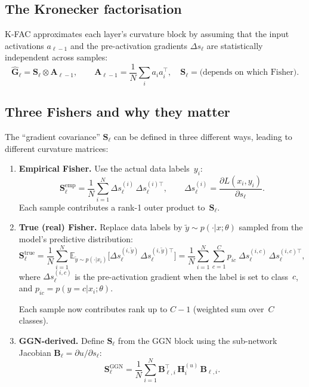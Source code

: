 \documentclass[11pt]{article}
\newcommand{\E}{\mathbb{E}}
\newcommand{\kron}{\otimes}
\begin{document}
\subsection{The Kronecker factorisation}

K-FAC approximates each layer's curvature block by assuming
that the input activations $a_{\ell-1}$ and the pre-activation
gradients $\Delta s_\ell$ are statistically independent across
samples:
\[
  \hat{\mathbf{G}}_\ell
  = \mathbf{S}_\ell \kron \mathbf{A}_{\ell-1},
  \qquad
  \mathbf{A}_{\ell-1} = \frac{1}{N}\sum_i a_i a_i^\top,
  \quad
  \mathbf{S}_\ell = \text{(depends on which Fisher)}.
\]

\subsection{Three Fishers and why they matter}
\label{sec:three-fishers}

The ``gradient covariance'' $\mathbf{S}_\ell$ can be defined in three
different ways, leading to different curvature matrices:

\begin{enumerate}
\item \textbf{Empirical Fisher.}\;
  Use the actual data labels~$y_i$:
  \[
    \mathbf{S}_\ell^{\text{emp}}
    = \frac{1}{N}\sum_{i=1}^{N}
      \Delta s_\ell^{(i)}\,\Delta s_\ell^{(i)\top},
    \qquad
    \Delta s_\ell^{(i)}
    = \frac{\partial L(x_i,y_i)}{\partial s_\ell}.
  \]
  Each sample contributes a rank-1 outer product to~$\mathbf{S}_\ell$.

\item \textbf{True (real) Fisher.}\;
  Replace data labels by $\tilde y\sim p(\cdot|x;\theta)$
  sampled from the model's predictive distribution:
  \[
    \mathbf{S}_\ell^{\text{true}}
    = \frac{1}{N}\sum_{i=1}^{N}
      \E_{\tilde y\sim p(\cdot|x_i)}
      \bigl[\Delta s_\ell^{(i,\tilde y)}\,
             \Delta s_\ell^{(i,\tilde y)\top}\bigr]
    = \frac{1}{N}\sum_{i=1}^{N}\sum_{c=1}^{C}
      p_{ic}\;\Delta s_\ell^{(i,c)}\,\Delta s_\ell^{(i,c)\top},
  \]
  where $\Delta s_\ell^{(i,c)}$ is the pre-activation gradient when the
  label is set to class~$c$, and $p_{ic} = p(y{=}c|x_i;\theta)$.

  Each sample now contributes rank up to $C{-}1$ (weighted sum
  over~$C$ classes).

\item \textbf{GGN-derived.}\;
  Define $\mathbf{S}_\ell$ from the GGN block using the sub-network
  Jacobian $\mathbf{B}_\ell = \partial u/\partial s_\ell$:
  \[
    \mathbf{S}_\ell^{\text{GGN}}
    = \frac{1}{N}\sum_{i=1}^{N}
      \mathbf{B}_{\ell,i}^\top\,\mathbf{H}_i^{(u)}\,\mathbf{B}_{\ell,i}.
  \]
\end{enumerate}
\end{document}
